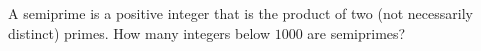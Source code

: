 A semiprime is a positive integer that is the product of two (not necessarily distinct) primes. How many integers below $1000$ are semiprimes?
